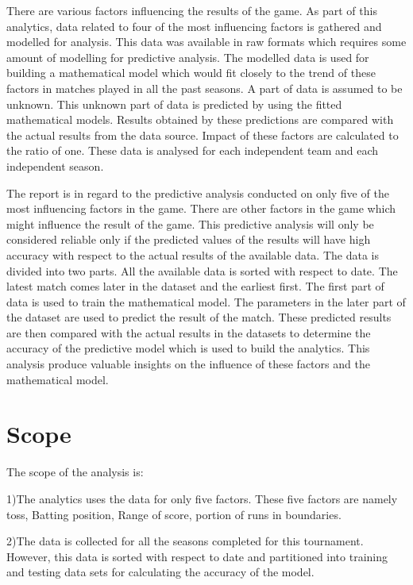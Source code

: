 \documentclass[sigconf]{acmart}
\begin{document}
There are various factors influencing the results of the game. As part of this analytics, data related to four of the most influencing factors is gathered and modelled for analysis. This data was available in raw formats which requires some amount of modelling for predictive analysis. The modelled data is used for building a mathematical model which would fit closely to the trend of these factors in matches played in all the past seasons. A part of data is assumed to be unknown. This unknown part of data is predicted by using the fitted mathematical models. Results obtained by these predictions are compared with the actual results from the data source. Impact of these factors are calculated to the ratio of one. These data is analysed for each independent team and each independent season.

 
The report is in regard to the predictive analysis conducted on only five of the most influencing factors in the game. There are other factors in the game which might influence the result of the game. This predictive analysis will only be considered reliable only if the predicted values of the results will have high accuracy with respect to the actual results of the available data. The data is divided into two parts. All the available data is sorted with respect to date. The latest match comes later in the dataset and the earliest first. The first part of data is used to train the mathematical model. The parameters in the later part of the dataset are used to predict the result of the match. These predicted results are then compared with the actual results in the datasets to determine the accuracy of the predictive model which is used to build the analytics. This analysis produce valuable insights on the influence of these factors and the mathematical model.


\section{Scope}

The scope of the analysis is:


1)The analytics uses the data for only five factors. These five factors are  namely toss, Batting position, Range of score, portion of runs in boundaries.


2)The data is collected for all the seasons completed for this tournament. However, this data is sorted with respect to date and partitioned into training and testing data sets for calculating the accuracy of the model.
\end{document}
